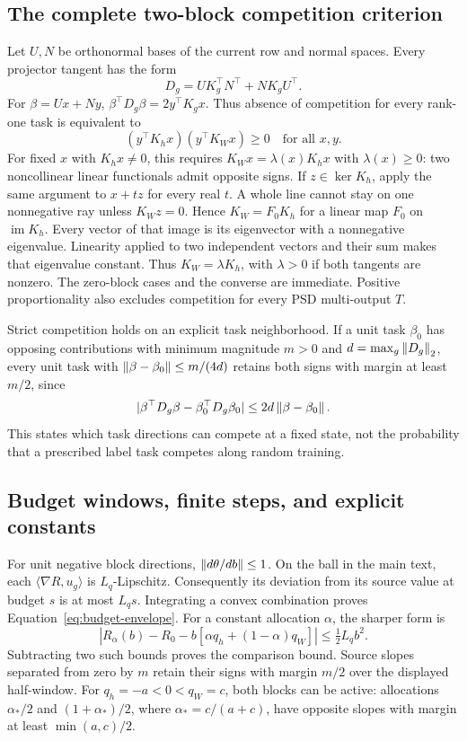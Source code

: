 \subsection{The complete two-block competition criterion}
Let $U,N$ be orthonormal bases of the current row and normal spaces. Every projector tangent has the form
\begin{equation}
 D_g=UK_g^\top N^\top+NK_gU^\top.
\end{equation}
For $\beta=Ux+Ny$, $\beta^\top D_g\beta=2y^\top K_gx$. Thus absence of competition for every rank-one task is equivalent to
\begin{equation}
 (y^\top K_hx)(y^\top K_Wx)\ge0\quad\text{for all }x,y.
\end{equation}
For fixed $x$ with $K_hx\ne0$, this requires $K_Wx=\lambda(x)K_hx$ with $\lambda(x)\ge0$: two noncollinear linear functionals admit opposite signs. If $z\in\ker K_h$, apply the same argument to $x+tz$ for every real $t$. A whole line cannot stay on one nonnegative ray unless $K_Wz=0$. Hence $K_W=F_0K_h$ for a linear map $F_0$ on $\operatorname{im}K_h$. Every vector of that image is its eigenvector with a nonnegative eigenvalue. Linearity applied to two independent vectors and their sum makes that eigenvalue constant. Thus $K_W=\lambda K_h$, with $\lambda>0$ if both tangents are nonzero. The zero-block cases and the converse are immediate. Positive proportionality also excludes competition for every PSD multi-output $T$.

Strict competition holds on an explicit task neighborhood. If a unit task $\beta_0$ has opposing contributions with minimum magnitude $m>0$ and $d=\max_g\left\lVert D_g\right\rVert_2$, every unit task with $\left\lVert \beta-\beta_0\right\rVert\le m/(4d)$ retains both signs with margin at least $m/2$, since
\begin{equation}
 |\beta^\top D_g\beta-\beta_0^\top D_g\beta_0|
 \le2d\left\lVert \beta-\beta_0\right\rVert.
\end{equation}
This states which task directions can compete at a fixed state, not the probability that a prescribed label task competes along random training.

\subsection{Budget windows, finite steps, and explicit constants}
For unit negative block directions, $\left\lVert d\theta/db\right\rVert\le1$. On the ball in the main text, each $\langle\nabla R,u_g\rangle$ is $L_q$-Lipschitz. Consequently its deviation from its source value at budget $s$ is at most $L_qs$. Integrating a convex combination proves Equation~\eqref{eq:budget-envelope}. For a constant allocation $\alpha$, the sharper form is
\begin{equation}
 |R_\alpha(b)-R_0-b[\alpha q_h+(1-\alpha)q_W]|
 \le\tfrac12L_qb^2.
\end{equation}
Subtracting two such bounds proves the comparison bound. Source slopes separated from zero by $m$ retain their signs with margin $m/2$ over the displayed half-window. For $q_h=-a<0<q_W=c$, both blocks can be active: allocations $\alpha_*/2$ and $(1+\alpha_*)/2$, where $\alpha_*=c/(a+c)$, have opposite slopes with margin at least $\min(a,c)/2$.

